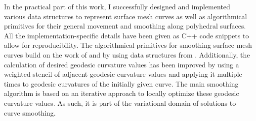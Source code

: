 \documentclass[crop=false]{stdlocal}
\begin{document}
  In the practical part of this work, I successfully designed and implemented various data structures to represent surface mesh curves as well as algorithmical primitives for their general movement and smoothing along polyhedral surfaces.
  All the implementation-specific details have been given as C++ code snippets to allow for reproducibility.
  The algorithmical primitives for smoothing surface mesh curves build on the work of \textcite{martinez2005} and \textcite{lawonn2014} by using data structures from \textcite{mancinelli2022}.
  Additionally, the calculation of desired geodesic curvature values has been improved by using a weighted stencil of adjacent geodesic curvature values and applying it multiple times to geodesic curvatures of the initially given curve.
  The main smoothing algorithm is based on an iterative approach to locally optimize these geodesic curvature values.
  As such, it is part of the variational domain of solutions to curve smoothing.


\end{document}
